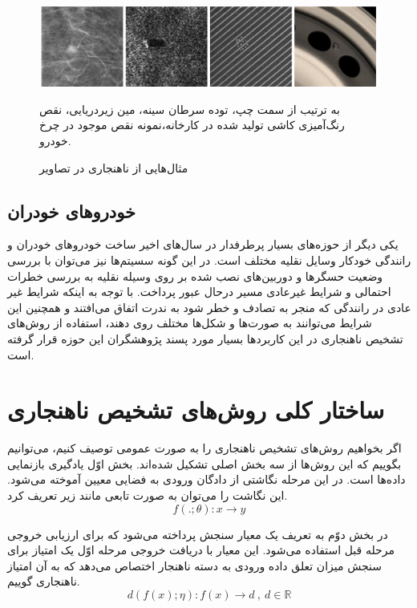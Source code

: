 \documentclass[12pt,a4paper]{report}
\theoremstyle{definition}
\theoremstyle{definition}
\begin{document}
\begin{figure}[!hp]
	\begin{center}
		\includegraphics[width=\linewidth]{./images/figures/image-anomaly-examples-1.png}
		\caption*{به ترتیب از سمت چپ، توده سرطان سینه، مین زیر‌دریایی، نقص رنگ‌آمیزی کاشی تولید شده در کارخانه،نمونه نقص موجود در چرخ خودرو.}
		\caption{
		مثال‌هایی از ناهنجاری در تصاویر
		\cite{T.Ehret}
		}		
		\label{fig:anomaly-example-1}
		\centering
	\end{center}
\end{figure}

\subsection{خودرو‌های خودران}
یکی دیگر از حوزه‌های بسیار پرطرفدار در سال‌های اخیر ساخت خودرو‌های خودران و رانندگی خودکار وسایل نقلیه مختلف است. در این گونه سسیتم‌ها نیز می‌توان با بررسی وضعیت حسگر‌ها و دوربین‌های نصب شده بر روی وسیله نقلیه به بررسی خطرات احتمالی و شرایط غیرعادی مسیر درحال عبور پرداخت. با توجه به اینکه شرایط غیر عادی در رانندگی که منجر به تصادف و خطر شود به ندرت اتفاق می‌افتند و همچنین این شرایط می‌توانند به صورت‌ها و شکل‌ها مختلف روی دهند، استفاده از روش‌های تشخیص ناهنجاری در این کاربردها بسیار مورد پسند پژوهشگران این حوزه قرار گرفته است.


\section{ساختار کلی روش‌های تشخیص ناهنجاری}
	اگر بخواهیم روش‌های تشخیص ناهنجاری را به صورت عمومی توصیف کنیم، می‌توانیم بگوییم که این روش‌ها از سه بخش اصلی تشکیل شده‌اند. بخش اوّل یادگیری بازنمایی داد‌ه‌ها است. در این مرحله نگاشتی از دادگان ورودی به فضایی معیین آموخته می‌شود. این نگاشت را می‌توان به صورت تابعی مانند زیر تعریف کرد.
\begin{equation}
f(.;\theta): x \rightarrow y
\end{equation}
	
در بخش دوّم به تعریف یک معیار سنجش پرداخته می‌شود که برای ارزیابی خروجی مرحله قبل استفاده می‌شود. این معیار با دریافت خروجی مرحله اوّل یک امتیاز برای سنجش میزان تعلق داده ورودی به دسته ناهنجار اختصاص می‌دهد که به آن امتیاز ناهنجاری گوییم.
\begin{equation}
d(f(x);\eta): f(x) \rightarrow d \  ,\  d \in \mathbb{R}
\end{equation}
\end{document}
